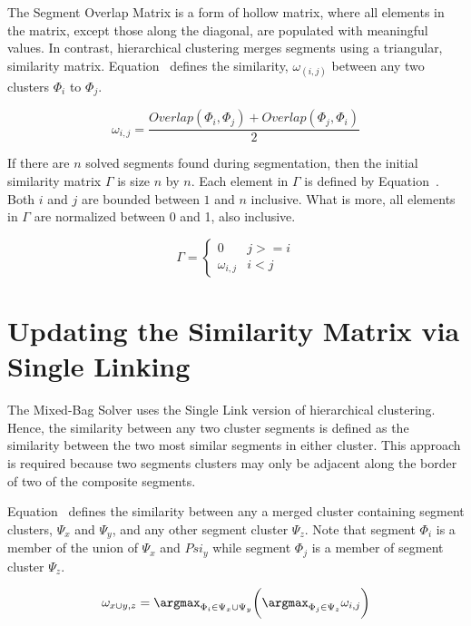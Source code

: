 The Segment Overlap Matrix is a form of hollow matrix, where all elements in the matrix, except those along the diagonal, are populated with meaningful values.  In contrast, hierarchical clustering merges segments using a triangular, similarity matrix.  Equation~ defines the similarity, $\omega_(i,j)$ between any two clusters $\Phi_i$ to $\Phi_j$.

\begin{equation} \label{eq:segmentSimilarity}
\omega_{i,j} = \frac{Overlap(\Phi_i, \Phi_j) + Overlap(\Phi_j, \Phi_i)}{2} 
\end{equation}

If there are $n$ solved segments found during segmentation, then the initial similarity matrix $\Gamma$ is size $n$ by $n$.  Each element in $\Gamma$ is defined by Equation~.  Both $i$ and $j$ are bounded between $1$ and $n$ inclusive.  What is more, all elements in $\Gamma$ are normalized between 0 and 1, also inclusive.

\begin{equation} \label{eq:similarityMatrix}
\Gamma = \begin{cases} 
	0 & j >= i
\\
	\omega_{i,j} & i < j
\end{cases} 
\end{equation}

\section{Updating the Similarity Matrix via Single Linking}

The Mixed-Bag Solver uses the Single Link version of hierarchical clustering.  Hence, the similarity between any two cluster segments is defined as the similarity between the two most similar segments in either cluster.  This approach is required because two segments clusters may only be adjacent along the border of two of the composite segments.  

Equation~ defines the similarity between any a merged cluster containing segment clusters, $\Psi_x$ and $\Psi_y$, and any other segment cluster $\Psi_z$.  Note that segment $\Phi_i$ is a member of the union of $\Psi_x$ and $Psi_y$ while segment $\Phi_j$ is a member of segment cluster $\Psi_z$.

\begin{equation} \label{eq:segmentClusterMerge}
	\omega_{x \cup y,z} = \argmax_{\Phi_i \in \Psi_x \cup \Psi_y} \bigg( \argmax_{\Phi_j \in \Psi_z} \omega_{i,j} \bigg) 
\end{equation}

